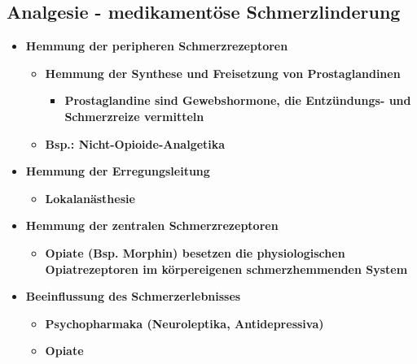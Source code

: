 \subsection{Analgesie - medikamentöse Schmerzlinderung}
	\begin{itemize}
		\item \textbf{Hemmung der peripheren Schmerzrezeptoren}
			\begin{itemize}
				\item \textbf{Hemmung der Synthese und Freisetzung von Prostaglandinen}
					\begin{itemize}
						\item \textbf{Prostaglandine sind Gewebshormone, die Entzündungs- und Schmerzreize vermitteln}
					\end{itemize}
				\item \textbf{Bsp.: Nicht-Opioide-Analgetika}
			\end{itemize}
		\item \textbf{Hemmung der Erregungsleitung}
			\begin{itemize}
				\item \textbf{Lokalanästhesie}
			\end{itemize}
		\item \textbf{Hemmung der zentralen Schmerzrezeptoren}
			\begin{itemize}
				\item \textbf{Opiate (Bsp. Morphin) besetzen die physiologischen Opiatrezeptoren im körpereigenen schmerzhemmenden System}
			\end{itemize}
		\item \textbf{Beeinflussung des Schmerzerlebnisses}
			\begin{itemize}
				\item \textbf{Psychopharmaka (Neuroleptika, Antidepressiva)}
				\item \textbf{Opiate}
			\end{itemize}
	\end{itemize}

